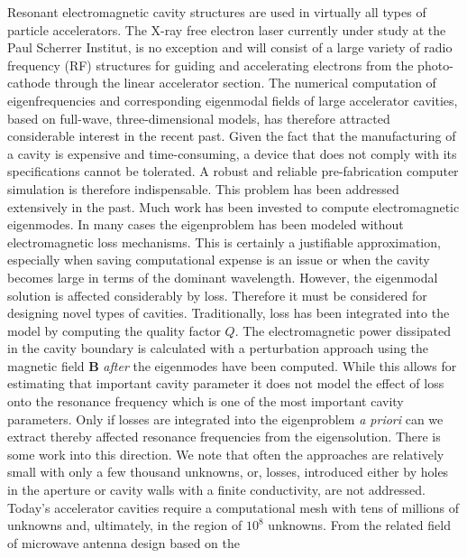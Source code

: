 \documentclass[11pt,a4paper]{article}
\begin{document}
{  Resonant electromagnetic cavity structures are used in virtually all
  types of particle accelerators.  The X-ray free electron laser
  currently under study at the Paul Scherrer Institut, is no exception
  and will consist of a large variety of radio frequency (RF) structures
  for guiding and accelerating electrons from the photo-cathode through
  the linear accelerator section.
  The numerical computation of eigenfrequencies and corresponding
  eigenmodal fields of large accelerator cavities, based on full-wave,
  three-dimensional models, has therefore attracted considerable
  interest in the recent past.
  Given the fact that the manufacturing of a cavity is expensive and
  time-consuming, a device that does not comply with its specifications
  cannot be tolerated.
  A robust and reliable pre-fabrication computer simulation is therefore
  indispensable.
  This problem has been addressed extensively in the past.
  Much work has been invested to compute electromagnetic eigenmodes.
  In many cases the eigenproblem has been modeled without electromagnetic
  loss mechanisms.
  This is certainly a justifiable approximation, especially when saving
  computational expense is an issue or when the cavity becomes
  large in terms of the dominant wavelength.
  However, the eigenmodal solution is affected considerably
  by loss. Therefore it must be considered for designing novel
  types of cavities.
  Traditionally, loss has been integrated into the model by computing
  the quality factor $Q$.
  The electromagnetic power dissipated in the cavity boundary is
  calculated with a perturbation approach using the magnetic field
  $\mathbf{B}$ \emph{after} the eigenmodes have been computed.
  While this allows for estimating that important cavity parameter
  it does not model the effect of loss onto the resonance frequency
  which is one of the most important cavity parameters.
  Only if losses are integrated into the eigenproblem \emph{a
    priori} can we extract thereby affected resonance frequencies from
  the eigensolution.
  There is some work into this direction.  We note that often the
  approaches are  relatively small with only a
  few thousand unknowns, or, losses, introduced either by holes in the
  aperture or cavity walls with a 
  finite conductivity, are not addressed.
  Today's accelerator cavities require a computational
  mesh with tens of millions of unknowns and, ultimately, in the region
  of $10^{8}$ unknowns.
  From the related field of microwave antenna design based on the
}
\end{document}
